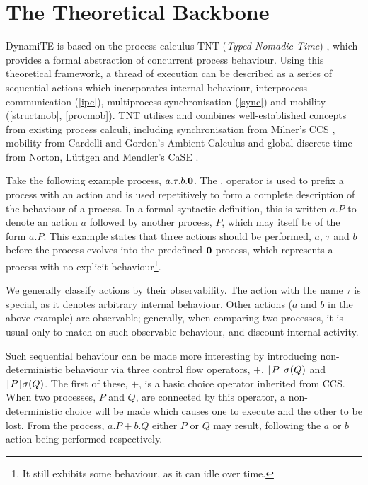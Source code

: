 \documentclass{acm_proc_article-sp}
\begin{document}
\section{The Theoretical Backbone}
\label{backbone}

DynamiTE is based on the process calculus TNT (\emph{Typed Nomadic
Time}) \cite{hughes:nt, tnt}, which provides a formal abstraction of
concurrent process behaviour.  Using this theoretical framework, a
thread of execution can be described as a series of sequential actions
which incorporates internal behaviour, interprocess communication
(\ref{ipc}), multiprocess synchronisation (\ref{sync}) and mobility
(\ref{structmob}, \ref{procmob}).  TNT utilises and combines
well-established concepts from existing process calculi, including
synchronisation from Milner's CCS \cite{milner:ccs}, mobility from
Cardelli and Gordon's Ambient Calculus \cite{amb} and global discrete
time from Norton, L{\"u}ttgen and Mendler's CaSE \cite{case}.

Take the following example process, $a.\tau.b.\textbf{0}$.  The $.$ operator
is used to prefix a process with an action and is used repetitively to
form a complete description of the behaviour of a process.  In a formal
syntactic definition, this is written $a.P$ to denote an action $a$
followed by another process, $P$, which may itself be of the form $a.P$.
This example states that three actions should be performed, $a$, $\tau$
and $b$ before the process evolves into the predefined $\textbf{0}$ process,
which represents a process with no explicit behaviour\footnote{It still
exhibits some behaviour, as it can idle over time.}.

We generally classify actions by their observability.  The action with
the name $\tau$ is special, as it denotes arbitrary internal behaviour.
Other actions ($a$ and $b$ in the above example) are observable;
generally, when comparing two processes, it is usual only to match 
on such observable behaviour, and discount internal activity.

Such sequential behaviour can be made more interesting by introducing
non-deterministic behaviour via three control flow operators, $+$,
$\lfloor{P}\rfloor {\sigma} ({Q})$ and $\lceil{P}\rceil {\sigma} ({Q})$.  The first of
these, $+$, is a basic choice operator inherited from CCS.  When two
processes, $P$ and $Q$, are connected by this operator, a
non-deterministic choice will be made which causes one to execute and
the other to be lost.  From the process, $a.P + b.Q$ either $P$ or $Q$
may result, following the $a$ or $b$ action being performed
respectively.
\end{document}
